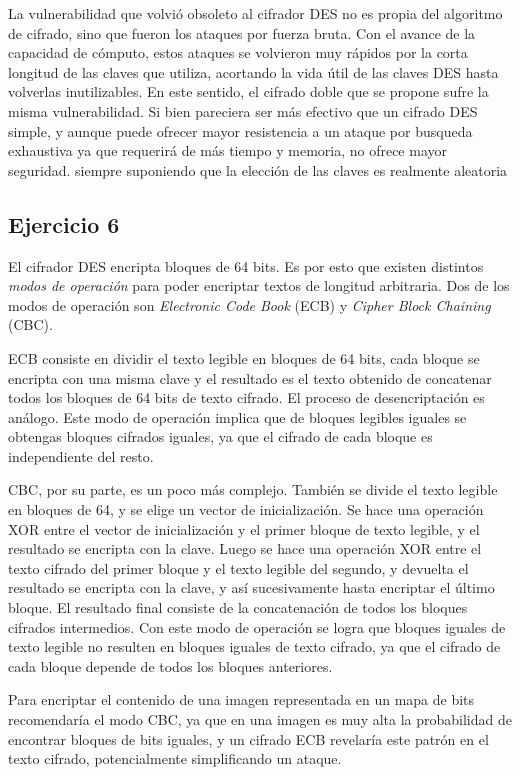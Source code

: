 \documentclass[11pt]{article}
\begin{document}
La vulnerabilidad que volvió obsoleto al cifrador DES no es propia del algoritmo de cifrado, sino que fueron los 
ataques por fuerza bruta. Con el avance de la capacidad de cómputo, estos ataques se volvieron muy rápidos por la 
corta longitud de las claves que utiliza, acortando la vida útil de las claves DES hasta volverlas inutilizables. 
En este sentido, el cifrado doble que se propone sufre la misma vulnerabilidad. Si bien pareciera ser más efectivo
que un cifrado DES simple, y aunque puede ofrecer mayor resistencia a un ataque por busqueda exhaustiva ya que 
requerirá de más tiempo y memoria, no ofrece mayor seguridad.
siempre suponiendo que la elección de las claves es realmente aleatoria

\subsection*{Ejercicio 6}
El cifrador DES encripta bloques de 64 bits. Es por esto que existen distintos \textit{modos de operación} para 
poder encriptar textos de longitud arbitraria. Dos de los modos de operación son \textit{Electronic Code Book} (ECB) 
y \textit{Cipher Block Chaining} (CBC).

ECB consiste en dividir el texto legible en bloques de 64 bits, cada bloque se encripta con una misma clave y 
el resultado es el texto obtenido de concatenar todos los bloques de 64 bits de texto cifrado. El proceso de 
desencriptación es análogo. Este modo de operación implica que de bloques legibles iguales se obtengas bloques 
cifrados iguales, ya que el cifrado de cada bloque es independiente del resto.

CBC, por su parte, es un poco más complejo. También se divide el texto legible en bloques de 64, y se elige un 
vector de inicialización. Se hace una operación XOR entre el vector de inicialización y el primer bloque de texto
legible, y el resultado se encripta con la clave. Luego se hace una operación XOR entre el texto cifrado del primer
bloque y el texto legible del segundo, y devuelta el resultado se encripta con la clave, y así sucesivamente hasta
encriptar el último bloque. El resultado final consiste de la concatenación de todos los bloques cifrados intermedios.
Con este modo de operación se logra que bloques iguales de texto legible no resulten en bloques iguales de texto 
cifrado, ya que el cifrado de cada bloque depende de todos los bloques anteriores.

Para encriptar el contenido de una imagen representada en un mapa de bits recomendaría el modo CBC, ya que en una 
imagen es muy alta la probabilidad de encontrar bloques de bits iguales, y un cifrado ECB revelaría este patrón en 
el texto cifrado, potencialmente simplificando un ataque.
\end{document}
